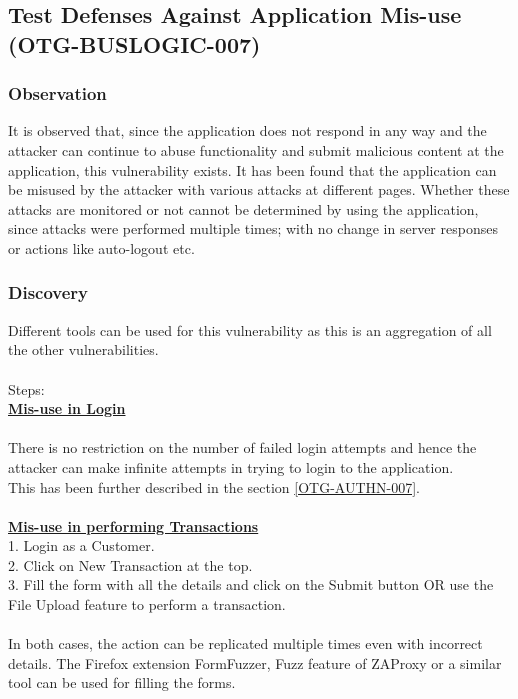 \subsection{Test Defenses Against Application Mis-use (OTG-BUSLOGIC-007)}

\subsubsection{Observation}
It is observed that, since the application does not respond in any way and the attacker can continue to abuse functionality and submit malicious content at the application, this vulnerability exists.
It has been found that the application can be misused by the attacker with various attacks at different pages. Whether these attacks are monitored or not cannot be determined by using the application, since attacks were performed multiple times; with no change in server responses or actions like auto-logout etc.

\subsubsection{Discovery}
Different tools can be used for this vulnerability as this is an aggregation of all the other vulnerabilities.\\
\\Steps: \\
\underline{\textbf{Mis-use in Login}}\\
\\There is no restriction on the number of failed login attempts and hence the attacker can make infinite attempts in trying to login to the application. \\
This has been further described in the section \ref{OTG-AUTHN-007}.\\
\\\underline{\textbf{Mis-use in performing Transactions}}\\
1. Login as a Customer. \\
2. Click on New Transaction at the top. \\
3. Fill the form with all the details and click on the Submit button OR use the File Upload feature to perform a transaction. \\
\\In both cases, the action can be replicated multiple times even with incorrect details. The Firefox extension FormFuzzer, Fuzz feature of ZAProxy or a similar tool can be used for filling the forms.


